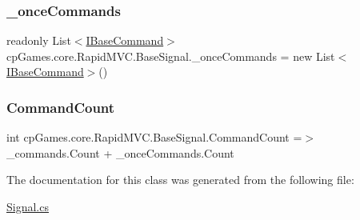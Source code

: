 \subsubsection{\texorpdfstring{\_onceCommands}{\_onceCommands}}
{\footnotesize\ttfamily readonly List$<$\mbox{\hyperlink{interfacecp_games_1_1core_1_1_rapid_m_v_c_1_1_i_base_command}{I\+Base\+Command}}$>$ cp\+Games.\+core.\+Rapid\+M\+V\+C.\+Base\+Signal.\+\_\+once\+Commands = new List$<$\mbox{\hyperlink{interfacecp_games_1_1core_1_1_rapid_m_v_c_1_1_i_base_command}{I\+Base\+Command}}$>$()\hspace{0.3cm}{\ttfamily [protected]}}

\mbox{\label{classcp_games_1_1core_1_1_rapid_m_v_c_1_1_base_signal_a3f273a225810de09d155144a5e948257}} 
\subsubsection{\texorpdfstring{CommandCount}{CommandCount}}
{\footnotesize\ttfamily int cp\+Games.\+core.\+Rapid\+M\+V\+C.\+Base\+Signal.\+Command\+Count =$>$ \+\_\+commands.\+Count + \+\_\+once\+Commands.\+Count}



The documentation for this class was generated from the following file\+:\begin{DoxyCompactItemize}
\item 
\mbox{\hyperlink{_signal_8cs}{Signal.\+cs}}\end{DoxyCompactItemize}
